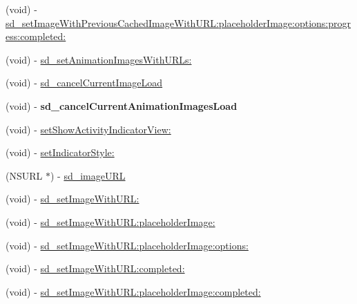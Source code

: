 \begin{DoxyCompactItemize}
\item 
(void) -\/ \mbox{\hyperlink{category_u_i_image_view_07_web_cache_08_a80c34aa94dae003b0f2fd61ddf85becf}{sd\+\_\+set\+Image\+With\+Previous\+Cached\+Image\+With\+U\+R\+L\+:placeholder\+Image\+:options\+:progress\+:completed\+:}}
\item 
(void) -\/ \mbox{\hyperlink{category_u_i_image_view_07_web_cache_08_a3d9c6bf83abb348e4130429f2087b8af}{sd\+\_\+set\+Animation\+Images\+With\+U\+R\+Ls\+:}}
\item 
(void) -\/ \mbox{\hyperlink{category_u_i_image_view_07_web_cache_08_a5ff7ec2145bd69460982ea6bd3b6026e}{sd\+\_\+cancel\+Current\+Image\+Load}}
\item 
\mbox{\label{category_u_i_image_view_07_web_cache_08_a3342e1c1ee44e86559b07b39fafebac1}} 
(void) -\/ {\bfseries sd\+\_\+cancel\+Current\+Animation\+Images\+Load}
\item 
(void) -\/ \mbox{\hyperlink{category_u_i_image_view_07_web_cache_08_a9f8a8476a2e362282980bfd4fd4cdb1a}{set\+Show\+Activity\+Indicator\+View\+:}}
\item 
(void) -\/ \mbox{\hyperlink{category_u_i_image_view_07_web_cache_08_a951036cd5b2847b39b0e3a372423fa4e}{set\+Indicator\+Style\+:}}
\item 
(N\+S\+U\+RL $\ast$) -\/ \mbox{\hyperlink{category_u_i_image_view_07_web_cache_08_abf2a037e36bc88eb9deeddbccd160755}{sd\+\_\+image\+U\+RL}}
\item 
(void) -\/ \mbox{\hyperlink{category_u_i_image_view_07_web_cache_08_a577e2abff6711b6eb793b6cd19f11dd3}{sd\+\_\+set\+Image\+With\+U\+R\+L\+:}}
\item 
(void) -\/ \mbox{\hyperlink{category_u_i_image_view_07_web_cache_08_a82e4106ff7460eff97dae9b79a539c41}{sd\+\_\+set\+Image\+With\+U\+R\+L\+:placeholder\+Image\+:}}
\item 
(void) -\/ \mbox{\hyperlink{category_u_i_image_view_07_web_cache_08_a4cc2a8f682e124d3df6495f74439a2cf}{sd\+\_\+set\+Image\+With\+U\+R\+L\+:placeholder\+Image\+:options\+:}}
\item 
(void) -\/ \mbox{\hyperlink{category_u_i_image_view_07_web_cache_08_a237803264855201b0f1150409fcbd74d}{sd\+\_\+set\+Image\+With\+U\+R\+L\+:completed\+:}}
\item 
(void) -\/ \mbox{\hyperlink{category_u_i_image_view_07_web_cache_08_afa4e73d2ffe8ee7c60b870a6730b7afd}{sd\+\_\+set\+Image\+With\+U\+R\+L\+:placeholder\+Image\+:completed\+:}}
\item 

\end{DoxyCompactItemize}
